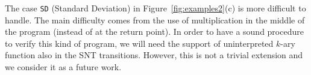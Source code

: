 The case \texttt{SD} (Standard Deviation) in Figure~\ref{fig:examples2}(c) is more difficult to handle. The main difficulty comes from the use of multiplication in the middle of the program (instead of at the return point). In order to have a sound procedure to verify this kind of program, we will need the support of uninterpreted $k$-ary function also in the SNT transitions. However, this is not a trivial extension and we consider it as a future work.


